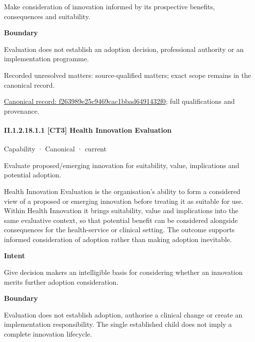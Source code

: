 Make consideration of innovation informed by its prospective benefits, consequences and suitability.



\textbf{Boundary}



Evaluation does not establish an adoption decision, professional authority or an implementation programme.


{\small Recorded unresolved matters: source-qualified matters; exact scope remains in the canonical record.}\par
{\footnotesize \href{../../../../continuum/strategy/capability/f263989e25c9469cac1bbad6491432f0.md}{Canonical record: f263989e25c9469cac1bbad6491432f0}; full qualifications and provenance.}\par
\paragraph*{II.1.2.18.1.1 [CT3] Health Innovation Evaluation}
\label{navigation:II.1.2.18.1.1}

\label{element:adc555bcb54e4de290869c7deebd128c}
{\small Capability · Canonical · current}\par

Evaluate proposed/emerging innovation for suitability, value, implications and potential adoption.



Health Innovation Evaluation is the organisation's ability to form a considered view of a proposed or emerging innovation before treating it as suitable for use. Within Health Innovation it brings suitability, value and implications into the same evaluative context, so that potential benefit can be considered alongside consequences for the health-service or clinical setting. The outcome supports informed consideration of adoption rather than making adoption inevitable.



\textbf{Intent}



Give decision makers an intelligible basis for considering whether an innovation merits further adoption consideration.



\textbf{Boundary}



Evaluation does not establish adoption, authorise a clinical change or create an implementation responsibility. The single established child does not imply a complete innovation lifecycle.


